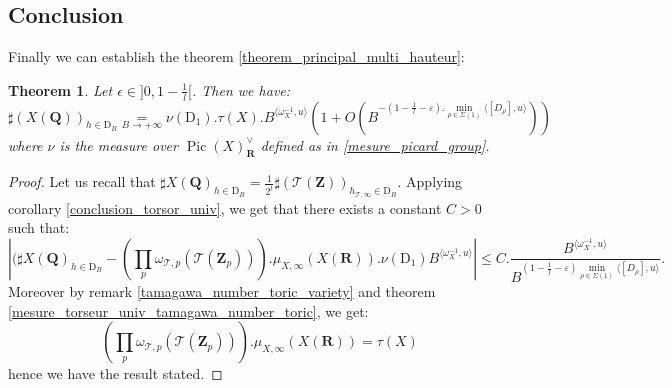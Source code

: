 \documentclass{proc-l}
\newcommand{\R}{\mathbf{R}}
\newcommand{\Z}{\mathbf{Z}}
\newcommand{\Q}{\mathbf{Q}}
\DeclareMathOperator{\Pic}{Pic}
\newcommand{\stackT}{\mathcal{T}}
\newcommand{\w}{\omega}
\newtheorem{theorem}{Theorem}[section]
\theoremstyle{definition}
\theoremstyle{remark}
\numberwithin{equation}{section}
\begin{document}
\subsection{Conclusion}



Finally we can establish the theorem \ref{theorem_principal_multi_hauteur}:

\begin{theorem}\label{theorem_final_variete_torique}
Let $\epsilon \in ]0,1 - \frac{1}{l}[$. Then we have:
\vspace{0,1 cm}
$$ \sharp ( X(\Q) )_{h \in \mathrm{D}_B} \underset{B \rightarrow +\infty}{=} \nu(\mathrm{D}_1 ) . \tau(X) .  B^{\langle \w_X^{-1},u \rangle} \left( 1 + O\left(B^{- (1 - \frac{1}{l} - \varepsilon).\min\limits_{\rho \in \Sigma(1)} \langle [D_{\rho}] , u \rangle} \right) \right)$$where $\nu$ is the measure over $\Pic(X)^{\vee}_{\R}$ defined as in \ref{mesure_picard_group}.
\end{theorem}

\begin{proof}
      Let us recall that $\sharp X(\Q)_{h \in \mathrm{D}_B} = \frac{1}{2^t} \sharp \left( \stackT(\Z) \right)_{h_{\stackT,\infty} \in \mathrm{D}_B}$. Applying corollary \ref{conclusion_torsor_univ}, we get that there exists a constant $C > 0$ such that:
       $$\left| (\sharp X(\Q)_{h \in \mathrm{D}_B}  - \left( \prod\limits_p \w_{\stackT,p}(\stackT(\Z_p)) \right) . \mu_{X,\infty}(X(\R)). \nu(\mathrm{D}_1) B^{ \langle \w_{X}^{-1} , u \rangle } \right| \leqslant C . \frac{B^{\langle \w_{X}^{-1} , u \rangle}}{B^{(1 - \frac{1}{l} - \varepsilon) \min\limits_{\rho \in \Sigma(1)} \langle [D_{\rho}] , u \rangle }} .$$Moreover by remark \ref{tamagawa_number_toric_variety} and theorem \ref{mesure_torseur_univ_tamagawa_number_toric}, we get: $$  \left( \prod\limits_p \w_{\stackT,p}(\stackT(\Z_p)) \right) . \mu_{X,\infty}(X(\R)) = \tau(X)$$hence we have the result stated.
\end{proof}


%




\end{document}
